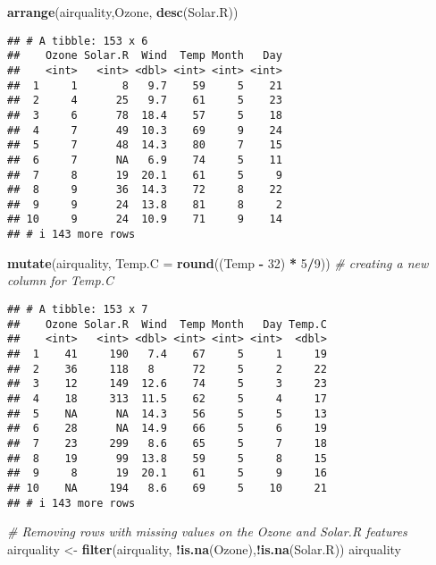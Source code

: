 \documentclass[
]{article}
\newenvironment{Shaded}{\begin{snugshade}}{\end{snugshade}}
\newcommand{\AttributeTok}[1]{\textcolor[rgb]{0.13,0.29,0.53}{#1}}
\newcommand{\CommentTok}[1]{\textcolor[rgb]{0.56,0.35,0.01}{\textit{#1}}}
\newcommand{\DecValTok}[1]{\textcolor[rgb]{0.00,0.00,0.81}{#1}}
\newcommand{\FunctionTok}[1]{\textcolor[rgb]{0.13,0.29,0.53}{\textbf{#1}}}
\newcommand{\NormalTok}[1]{#1}
\newcommand{\OtherTok}[1]{\textcolor[rgb]{0.56,0.35,0.01}{#1}}
\newcommand{\SpecialCharTok}[1]{\textcolor[rgb]{0.81,0.36,0.00}{\textbf{#1}}}
\begin{document}
\begin{Shaded}
\begin{Highlighting}[]
\FunctionTok{arrange}\NormalTok{(airquality,Ozone, }\FunctionTok{desc}\NormalTok{(Solar.R))}
\end{Highlighting}
\end{Shaded}

\begin{verbatim}
## # A tibble: 153 x 6
##    Ozone Solar.R  Wind  Temp Month   Day
##    <int>   <int> <dbl> <int> <int> <int>
##  1     1       8   9.7    59     5    21
##  2     4      25   9.7    61     5    23
##  3     6      78  18.4    57     5    18
##  4     7      49  10.3    69     9    24
##  5     7      48  14.3    80     7    15
##  6     7      NA   6.9    74     5    11
##  7     8      19  20.1    61     5     9
##  8     9      36  14.3    72     8    22
##  9     9      24  13.8    81     8     2
## 10     9      24  10.9    71     9    14
## # i 143 more rows
\end{verbatim}

\begin{Shaded}
\begin{Highlighting}[]
\FunctionTok{mutate}\NormalTok{(airquality, }\AttributeTok{Temp.C =} \FunctionTok{round}\NormalTok{((Temp }\SpecialCharTok{{-}} \DecValTok{32}\NormalTok{) }\SpecialCharTok{*} \DecValTok{5}\SpecialCharTok{/}\DecValTok{9}\NormalTok{)) }\CommentTok{\# creating a new column for Temp.C}
\end{Highlighting}
\end{Shaded}

\begin{verbatim}
## # A tibble: 153 x 7
##    Ozone Solar.R  Wind  Temp Month   Day Temp.C
##    <int>   <int> <dbl> <int> <int> <int>  <dbl>
##  1    41     190   7.4    67     5     1     19
##  2    36     118   8      72     5     2     22
##  3    12     149  12.6    74     5     3     23
##  4    18     313  11.5    62     5     4     17
##  5    NA      NA  14.3    56     5     5     13
##  6    28      NA  14.9    66     5     6     19
##  7    23     299   8.6    65     5     7     18
##  8    19      99  13.8    59     5     8     15
##  9     8      19  20.1    61     5     9     16
## 10    NA     194   8.6    69     5    10     21
## # i 143 more rows
\end{verbatim}

\begin{Shaded}
\begin{Highlighting}[]
\CommentTok{\# Removing rows with missing values on the Ozone and Solar.R features}
\NormalTok{airquality }\OtherTok{\textless{}{-}} \FunctionTok{filter}\NormalTok{(airquality, }\SpecialCharTok{!}\FunctionTok{is.na}\NormalTok{(Ozone),}\SpecialCharTok{!}\FunctionTok{is.na}\NormalTok{(Solar.R))}
\NormalTok{airquality}
\end{Highlighting}
\end{Shaded}
\end{document}
